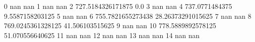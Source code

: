 0 nan nan
1 nan nan
2 727.5184326171875 0.0
3 nan nan
4 737.0771484375 9.5587158203125
5 nan nan
6 755.7821655273438 28.26373291015625
7 nan nan
8 769.0245361328125 41.506103515625
9 nan nan
10 778.5889892578125 51.070556640625
11 nan nan
12 nan nan
13 nan nan
14 nan nan

